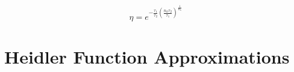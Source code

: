 

\begin{equation}
    \eta =e^{-\frac{\tau _1}{\tau _2} \left(\frac{n_h \tau _2}{\tau _1}\right)^{\frac{1}{n_h}}}
    \label{eqn:eta}
\end{equation}



\section{Heidler Function Approximations}
\label{sec:background_approximations}
